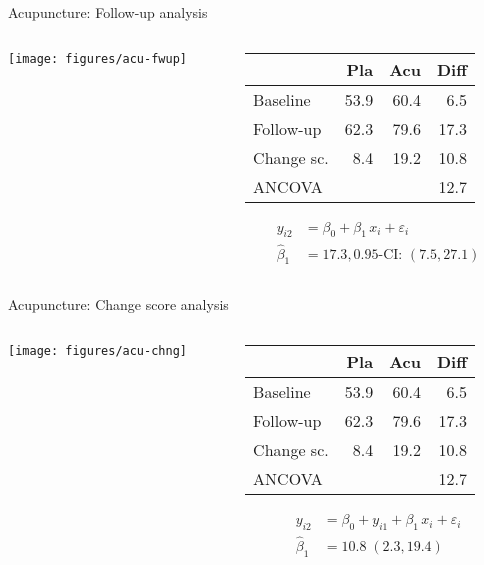 \documentclass[aspectratio=169]{beamer}
\begin{document}
\begin{frame}{Acupuncture: Follow-up analysis}
\begin{columns}[T]
\begin{column}{5.5cm}
  \texttt{[image: figures/acu-fwup]}
\end{column}
%
\begin{column}{5.5cm}
  \vspace*{1em}\small
  \begin{tabular}{lrrr}
  \hline
             &  Pla &  Acu & Diff \\ \hline
  Baseline   & 53.9 & 60.4 &  6.5 \\
  Follow-up  & 62.3 & 79.6 & 17.3 \\
  Change sc. &  8.4 & 19.2 & 10.8 \\
  ANCOVA     &      &      & 12.7 \\ \hline
  \end{tabular}
\begin{align*}
         y_{i2} &= \beta_0 + \beta_1 \, x_i + \varepsilon_i \\
  \hat{\beta}_1 &= 17.3, 0.95\text{-CI: } (7.5, 27.1)
\end{align*}
\end{column}
\end{columns}
\end{frame}


\begin{frame}{Acupuncture: Change score analysis}
\begin{columns}[T]
\begin{column}{5.5cm}
  \texttt{[image: figures/acu-chng]}
\end{column}
%
\begin{column}{5.5cm}
  \vspace*{1em}\small
  \begin{tabular}{lrrr}
  \hline
             &  Pla &  Acu & Diff \\ \hline
  Baseline   & 53.9 & 60.4 &  6.5 \\
  Follow-up  & 62.3 & 79.6 & 17.3 \\
  Change sc. &  8.4 & 19.2 & 10.8 \\
  ANCOVA     &      &      & 12.7 \\ \hline
  \end{tabular}
\begin{align*}
         y_{i2} &= \beta_0 + y_{i1} + \beta_1 \, x_i + \varepsilon_i \\
  \hat{\beta}_1 &= 10.8 \; (2.3, 19.4)
\end{align*}
\end{column}
\end{columns}
\end{frame}
\end{document}
